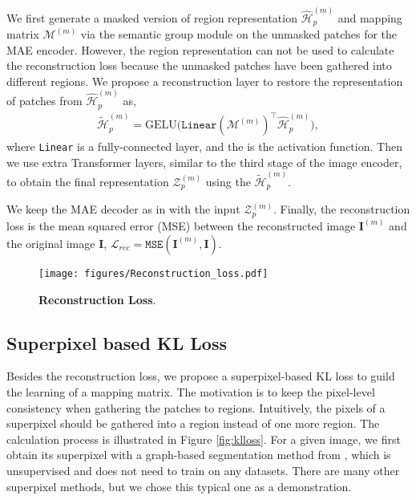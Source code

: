 \documentclass{article}
\theoremstyle{plain}
\theoremstyle{definition}
\theoremstyle{remark}
\begin{document}
We first generate a masked version of region representation $\hat{\mathcal{H}}_p^{(m)}$ and mapping matrix $\mathcal{M}^{(m)}$ via the semantic group module on the unmasked patches for the MAE encoder. However, the region representation can not be used to calculate the reconstruction loss because the unmasked patches have been gathered into different regions. We propose a reconstruction layer to restore the representation of patches from $\hat{\mathcal{H}}_p^{(m)}$ as,
\begin{align}
	\tilde{\mathcal{H}}_p^{(m)} = \text{GELU}\big(\texttt{Linear}(\mathcal{M}^{(m)})^{\top}\hat{\mathcal{H}}_p^{(m)}\big),
\end{align}
where \texttt{Linear} is a fully-connected layer, and the  is the activation function.
Then we use extra Transformer layers, similar to the third stage of the image encoder, to obtain the final representation $\mathcal{Z}_p^{(m)}$ using the $\tilde{\mathcal{H}}_p^{(m)}$.

We keep the MAE decoder as in \cite{He2022Masked} with the input $\mathcal{Z}_p^{(m)}$. Finally, the reconstruction loss is the mean squared error (MSE) between the reconstructed image $\mathbf{I}^{(m)}$ and the original image $\mathbf{I}$, $\mathcal{L}_{rec} = \texttt{MSE}(\mathbf{I}^{(m)}, \mathbf{I})$. 
\begin{figure}[tp]
    \centering
    \texttt{[image: figures/Reconstruction\_loss.pdf]}
    \caption{\textbf{Reconstruction Loss}.}
    \label{fig:reconstruction_loss}
\end{figure}

\subsection{Superpixel based KL Loss}
Besides the reconstruction loss, we propose a superpixel-based KL loss to guild the learning of a mapping matrix. The motivation is to keep the pixel-level consistency when gathering the patches to regions. Intuitively, the pixels of a superpixel should be gathered into a region instead of one more region. The calculation process is illustrated in Figure \ref{fig:klloss}. For a given image, we first obtain its superpixel with a graph-based segmentation method from \cite{felzenszwalb2004efficient}, which is unsupervised and does not need to train on any datasets. There are many other superpixel methods, but we chose this typical one as a demonstration. 
\end{document}
